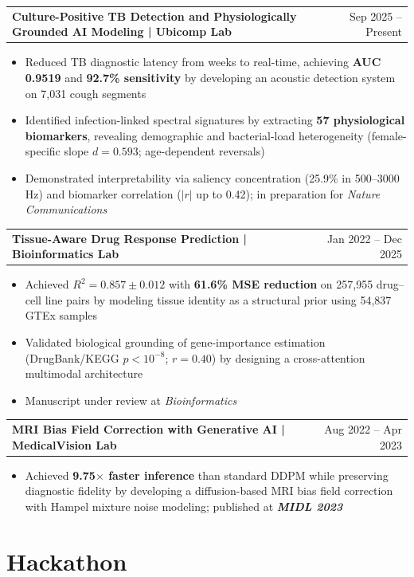 \documentclass[a4paper,10pt]{article}
\makeatletter
\newenvironment{joblong}[2]
    {
    \begin{tabularx}{\linewidth}{@{}l X r@{}}
    \textbf{#1} & \hfill &  #2 \\[3.75pt]
    \end{tabularx}
    \begin{minipage}[t]{\linewidth}
    \begin{itemize}[nosep,after=\strut, leftmargin=1em, itemsep=3pt,label=--]
    }
    {
    \end{itemize}
    \end{minipage}    
    }
\makeatother
\begin{document}
\vspace{-5pt}

\begin{joblong}{Culture-Positive TB Detection and Physiologically Grounded AI Modeling | Ubicomp Lab}{Sep 2025 -- Present}
\item Reduced TB diagnostic latency from weeks to real-time, achieving \textbf{AUC 0.9519} and \textbf{92.7\% sensitivity} by developing an acoustic detection system on 7,031 cough segments
\item Identified infection-linked spectral signatures by extracting \textbf{57 physiological biomarkers}, revealing demographic and bacterial-load heterogeneity (female-specific slope $d=0.593$; age-dependent reversals)
\item Demonstrated interpretability via saliency concentration (25.9\% in 500--3000 Hz) and biomarker correlation ($|r|$ up to 0.42); in preparation for \textit{Nature Communications}
\end{joblong}

\vspace{-5pt}

\begin{joblong}{Tissue-Aware Drug Response Prediction | Bioinformatics Lab}{Jan 2022 -- Dec 2025}
\item Achieved \textbf{$R^2 = 0.857 \pm 0.012$} with \textbf{61.6\% MSE reduction} on 257,955 drug--cell line pairs by modeling tissue identity as a structural prior using 54,837 GTEx samples
\item Validated biological grounding of gene-importance estimation (DrugBank/KEGG $p < 10^{-8}$; $r=0.40$) by designing a cross-attention multimodal architecture
\item Manuscript under review at \textit{Bioinformatics}
\end{joblong}

\vspace{-5pt}

\begin{joblong}{MRI Bias Field Correction with Generative AI | MedicalVision Lab}{Aug 2022 -- Apr 2023}
\item Achieved \textbf{9.75$\times$ faster inference} than standard DDPM while preserving diagnostic fidelity by developing a diffusion-based MRI bias field correction with Hampel mixture noise modeling; published at \textbf{\textit{MIDL 2023}}
\end{joblong}


\section{Hackathon}
\end{document}
